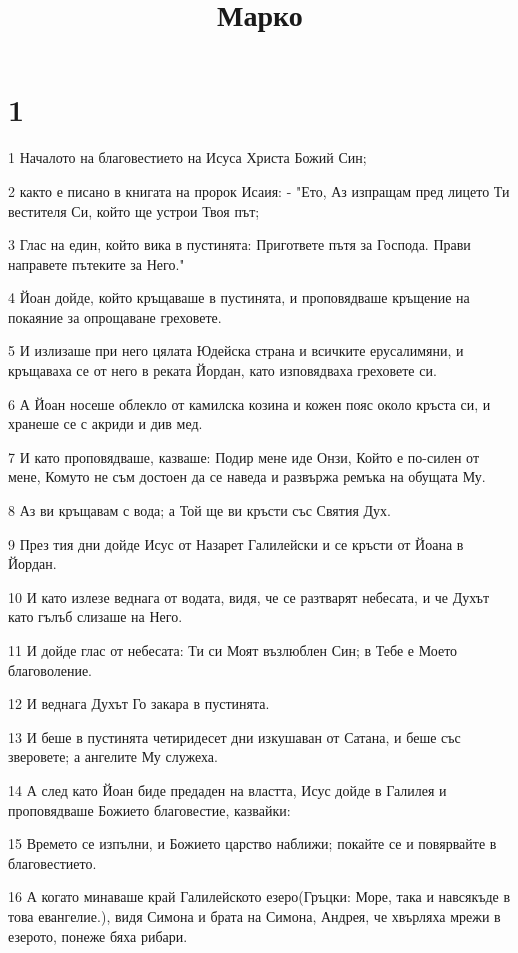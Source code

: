 

\title{Марко}


\chapter{1}

\par 1 Началото на благовестието на Исуса Христа Божий Син;
\par 2 както е писано в книгата на пророк Исаия: - "Ето, Аз изпращам пред лицето Ти вестителя Си, който ще устрои Твоя път;
\par 3 Глас на един, който вика в пустинята: Пригответе пътя за Господа. Прави направете пътеките за Него."
\par 4 Йоан дойде, който кръщаваше в пустинята, и проповядваше кръщение на покаяние за опрощаване греховете.
\par 5 И излизаше при него цялата Юдейска страна и всичките ерусалимяни, и кръщаваха се от него в реката Йордан, като изповядваха греховете си.
\par 6 А Йоан носеше облекло от камилска козина и кожен пояс около кръста си, и хранеше се с акриди и див мед.
\par 7 И като проповядваше, казваше: Подир мене иде Онзи, Който е по-силен от мене, Комуто не съм достоен да се наведа и развържа ремъка на обущата Му.
\par 8 Аз ви кръщавам с вода; а Той ще ви кръсти със Святия Дух.
\par 9 През тия дни дойде Исус от Назарет Галилейски и се кръсти от Йоана в Йордан.
\par 10 И като излезе веднага от водата, видя, че се разтварят небесата, и че Духът като гълъб слизаше на Него.
\par 11 И дойде глас от небесата: Ти си Моят възлюблен Син; в Тебе е Моето благоволение.
\par 12 И веднага Духът Го закара в пустинята.
\par 13 И беше в пустинята четиридесет дни изкушаван от Сатана, и беше със зверовете; а ангелите Му служеха.
\par 14 А след като Йоан биде предаден на властта, Исус дойде в Галилея и проповядваше Божието благовестие, казвайки:
\par 15 Времето се изпълни, и Божието царство наближи; покайте се и повярвайте в благовестието.
\par 16 А когато минаваше край Галилейското езеро(Гръцки: Море, така и навсякъде в това евангелие.), видя Симона и брата на Симона, Андрея, че хвърляха мрежи в езерото, понеже бяха рибари.
